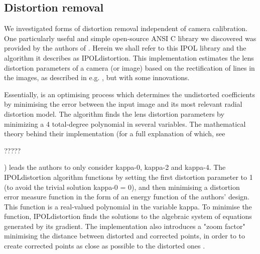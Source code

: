 
\subsection{Distortion removal}



We investigated forms of distortion removal independent of camera calibration. One particularly useful and simple open-source ANSI C library we discovered was provided by the authors of \cite{algebraic-distortion}. Herein we shall refer to this IPOL library and the algorithm it describes as IPOLdistortion. This implementation estimates the lens distortion parameters of a camera (or image) based on the rectification of lines in the images, as described in e.g. \cite{straightlines}, but with some innovations.

Essentially, \cite{algebraic-distortion} is an optimising process which determines the undistorted coefficients by minimising the error between the input image and its most relevant radial distortion model. The algorithm finds the lens distortion parameters by minimizing a 4 total-degree polynomial in several variables. The mathematical theory behind their implementation (for a full explanation of which, see 

?????

) leads the authors to only consider kappa-0, kappa-2 and kappa-4. The IPOLdistortion algorithm functions by setting the first distortion parameter to 1 (to avoid the trivial solution kappa-0 = 0), and then minimising a distortion error measure function in the form of an energy function of the authors' design. This function is a real-valued polynomial in the variable kappa. To minimise the function, IPOLdistortion finds the solutions to the algebraic system of equations generated by its gradient. The implementation also introduces a "zoom factor" minimising the distance between distorted and corrected points, in order to to create corrected points as close as possible to the distorted ones \cite{algebraic-distortion}.

